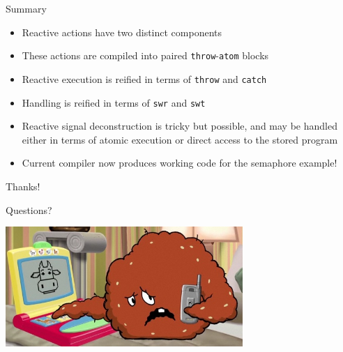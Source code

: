 \documentclass{beamer}
\begin{document}
\begin{frame}{Summary}

\begin{itemize}

\item{Reactive actions have two distinct components}

\item{These actions are compiled into paired \texttt{throw}-\texttt{atom} blocks}

\item{Reactive execution is reified in terms of \texttt{throw} and \texttt{catch}}

\item{Handling is reified in terms of \texttt{swr} and \texttt{swt}}

\item{Reactive signal deconstruction is tricky but possible, and may be handled either in terms of atomic execution or direct access to the stored program}

\item{Current compiler now produces working code for the semaphore example!}

\end{itemize}

\end{frame}

\begin{frame}{Thanks!}

\begin{structure}{Questions?}

\includegraphics[width=9cm]{questions}

\end{structure}

\end{frame}
\end{document}
